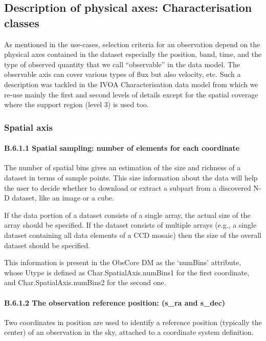 \documentclass[11pt,a4paper]{ivoa}
\begin{document}
\subsection{Description of physical axes: Characterisation classes}
As mentioned in the use-cases, selection criteria for an observation depend on the physical axes contained in the
dataset especially the position, band, time, and the type of observed quantity that we call ``observable'' in the data
model. The observable axis can cover various types of flux but also velocity, etc.  Such a description was tackled in
the IVOA Characterisation data model \citep{2008ivoa.spec.0325L} from which we re-use mainly the first and second levels
of details except for the spatial coverage where the support region (level 3) is used too.

\subsubsection{Spatial axis}

\paragraph{B.6.1.1 Spatial sampling: number of elements for each coordinate}
The number of spatial bins gives an estimation of the size and richness of a dataset in terms of sample points. This
size information about the data will help the user to decide whether to download or extract a subpart from a discovered
N-D dataset, like an image or a cube.

If the data portion of a dataset consists of a single array, the actual size of the array should be specified.  If the
dataset consists of multiple arrays (e.g., a single dataset containing all data elements of a CCD mosaic) then the size
of the overall dataset should be specified.

This information is present in the ObsCore DM as the `numBins' attribute, whose Utype is defined as
Char.SpatialAxis.numBins1 for the first coordinate, and Char.SpatialAxis.numBins2 for the second one.

\paragraph{B.6.1.2 The observation reference position: (s\_ra and s\_dec)}
Two coordinates in position are used to identify a reference position (typically the center) of an observation in the
sky, attached to a coordinate system definition.
\end{document}
